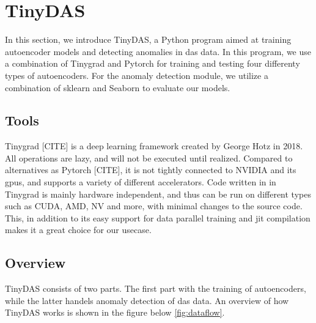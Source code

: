 \section{TinyDAS}

In this section, we introduce TinyDAS, a Python program aimed at training autoencoder models and detecting anomalies in \acrshort{das} data. In this program, we use a combination of Tinygrad and Pytorch for training and testing four differenty types of autoencoders. For the anomaly detection module, we utilize a combination of sklearn and Seaborn to evaluate our models.

\subsection{Tools}


Tinygrad [CITE] is a deep learning framework created by George Hotz in 2018. All operations are lazy, and will not be executed until realized. 
Compared to alternatives as Pytorch [CITE], it is not tightly connected to NVIDIA and its \acrshort{gpu}s, and supports a variety of different accelerators. Code written in in Tinygrad is mainly hardware independent, and thus can be run on different types such as CUDA, AMD, NV and more, with minimal changes to the source code. This, in addition to its easy support for data parallel training and \acrshort{jit} compilation makes it a great choice for our usecase. \\

\subsection{Overview}

TinyDAS consists of two parts. The first part with the training of autoencoders, while the latter handels anomaly detection of \acrshort{das} data. An overview of how TinyDAS works is shown in the figure below \ref{fig:dataflow}.

